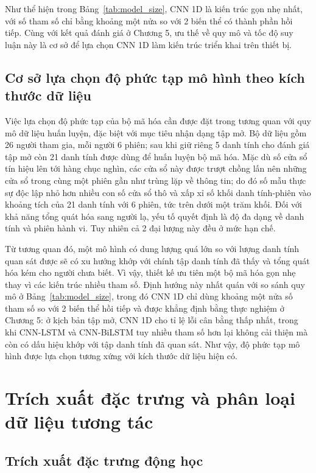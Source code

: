 \documentclass[../DoAn.tex]{subfiles}
\begin{document}
Như thể hiện trong Bảng~\ref{tab:model_size}, CNN 1D là kiến trúc gọn nhẹ nhất, với số tham số chỉ bằng khoảng một nửa so với 2 biến thể có thành phần hồi tiếp. Cùng với kết quả đánh giá ở Chương 5, ưu thế về quy mô và tốc độ suy luận này là cơ sở để lựa chọn CNN 1D làm kiến trúc triển khai trên thiết bị.

\subsection{Cơ sở lựa chọn độ phức tạp mô hình theo kích thước dữ liệu}

Việc lựa chọn độ phức tạp của bộ mã hóa cần được đặt trong tương quan với quy mô dữ liệu huấn luyện, đặc biệt với mục tiêu nhận dạng tập mở. Bộ dữ liệu gồm 26 người tham gia, mỗi người 6 phiên; sau khi giữ riêng 5 danh tính cho đánh giá tập mở còn 21 danh tính được dùng để huấn luyện bộ mã hóa. Mặc dù số cửa sổ tín hiệu lên tới hàng chục nghìn, các cửa sổ này được trượt chồng lấn nên những cửa sổ trong cùng một phiên gần như trùng lặp về thông tin; do đó số mẫu thực sự độc lập nhỏ hơn nhiều con số cửa sổ thô và xấp xỉ số khối danh tính-phiên vào khoảng tích của 21 danh tính với 6 phiên, tức trên dưới một trăm khối. Đối với khả năng tổng quát hóa sang người lạ, yếu tố quyết định là độ đa dạng về danh tính và phiên hành vi. Tuy nhiên cả 2 đại lượng này đều ở mức hạn chế.

Từ tương quan đó, một mô hình có dung lượng quá lớn so với lượng danh tính quan sát được sẽ có xu hướng khớp với chính tập danh tính đã thấy và tổng quát hóa kém cho người chưa biết. Vì vậy, thiết kế ưu tiên một bộ mã hóa gọn nhẹ thay vì các kiến trúc nhiều tham số. Định hướng này nhất quán với so sánh quy mô ở Bảng~\ref{tab:model_size}, trong đó CNN 1D chỉ dùng khoảng một nửa số tham số so với 2 biến thể hồi tiếp và được khẳng định bằng thực nghiệm ở Chương 5: ở kịch bản tập mở, CNN 1D cho tỉ lệ lỗi cân bằng thấp nhất, trong khi CNN-LSTM và CNN-BiLSTM tuy nhiều tham số hơn lại không cải thiện mà còn có dấu hiệu khớp với tập danh tính đã quan sát. Như vậy, độ phức tạp mô hình được lựa chọn tương xứng với kích thước dữ liệu hiện có.

\section{Trích xuất đặc trưng và phân loại dữ liệu tương tác}
\label{sec:touchmodel}

\subsection{Trích xuất đặc trưng động học}
\end{document}
